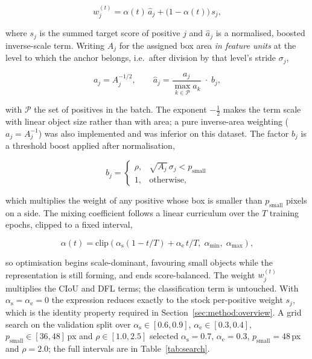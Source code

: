 \documentclass[10pt,twocolumn,a4paper]{article}
\begin{document}
\begin{equation}
w_j^{(t)} = \alpha(t)\,\hat{a}_j + \bigl(1-\alpha(t)\bigr)\,s_j ,
\label{eq:swa}
\end{equation}

\noindent where $s_j$ is the summed target score of positive $j$ and $\hat a_j$
is a normalised, boosted inverse-scale term. Writing $A_j$ for the assigned box
area \emph{in feature units} at the level to which the anchor belongs, i.e.\
after division by that level's stride $\sigma_j$,

\begin{equation}
a_j = A_j^{-1/2},
\qquad
\hat a_j = \frac{a_j}{\max_{k \in \mathcal{P}} a_k}\; \cdot \; b_j ,
\label{eq:invarea}
\end{equation}

\noindent with $\mathcal{P}$ the set of positives in the batch. The exponent
$-\tfrac12$ makes the term scale with linear object size rather than with area;
a pure inverse-area weighting ($a_j = A_j^{-1}$) was also implemented and was
inferior on this dataset. The factor $b_j$ is a threshold boost applied after
normalisation,

\begin{equation}
b_j =
\begin{cases}
\rho, & \sqrt{A_j}\,\sigma_j < p_{\text{small}} \\
1, & \text{otherwise,}
\end{cases}
\label{eq:boost}
\end{equation}

\noindent which multiplies the weight of any positive whose box is smaller than
$p_{\text{small}}$ pixels on a side. The mixing coefficient follows a linear
curriculum over the $T$ training epochs, clipped to a fixed interval,

\begin{equation}
\alpha(t) = \mathrm{clip}\left(
\alpha_{\text{s}} \left(1 - t/T\right) + \alpha_{\text{e}}\, t/T,
\;\alpha_{\min},\; \alpha_{\max} \right),
\label{eq:curriculum}
\end{equation}

\noindent so optimisation begins scale-dominant, favouring small objects while
the representation is still forming, and ends score-balanced. The weight
$w_j^{(t)}$ multiplies the CIoU and DFL terms; the classification term is
untouched. With $\alpha_{\text{s}} = \alpha_{\text{e}} = 0$ the expression
reduces exactly to the stock per-positive weight $s_j$, which is the identity
property required in Section~\ref{sec:method:overview}. A grid search on the
validation split over $\alpha_{\text{s}} \in [0.6,0.9]$, $\alpha_{\text{e}} \in
[0.3,0.4]$, $p_{\text{small}} \in [36,48]$\,px and $\rho \in [1.0,2.5]$ selected
$\alpha_{\text{s}} = 0.7$, $\alpha_{\text{e}} = 0.3$, $p_{\text{small}} = 48$\,px
and $\rho = 2.0$; the full intervals are in Table~\ref{tab:search}.
\end{document}

